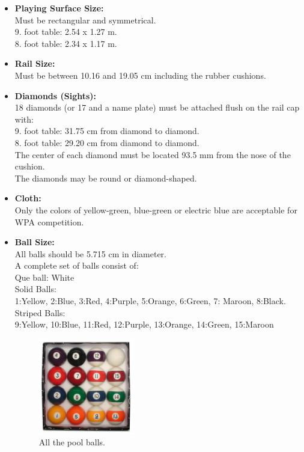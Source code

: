 \begin{itemize}
	\item \textbf{Playing Surface Size:}\\
		Must be rectangular and symmetrical.\\
		9. foot table: 2.54 x 1.27 m.\\
		8. foot table: 2.34 x 1.17 m.\\
	\item \textbf{Rail Size:}\\
		Must be between 10.16 and 19.05 cm including the rubber cushions.\\
	\item \textbf{Diamonds (Sights):}\\
		18 diamonds (or 17 and a name plate) must be attached flush on the rail cap with:\\
		9. foot table: 31.75 cm from diamond to diamond.\\
		8. foot table: 29.20 cm from diamond to diamond.\\
		The center of each diamond must be located 93.5 mm from the nose of the cushion.\\
		The diamonds may be round or diamond-shaped.\\
	\item \textbf{Cloth:}\\
		Only the colors of yellow-green, blue-green or electric blue are acceptable for WPA competition. \\
	\item \textbf{Ball Size:}\\
		All balls should be 5.715 cm in diameter.\\
		A complete set of balls consist of:\\
		Que ball: White\\
		Solid Balls:\\
		\hspace*{10 mm}	1:Yellow, 2:Blue, 3:Red, 4:Purple, 5:Orange, 6:Green, 7: Maroon, 8:Black.\\
		Striped Balls:\\
		\hspace*{10 mm}	9:Yellow, 10:Blue, 11:Red, 12:Purple, 13:Orange, 14:Green, 15:Maroon\\
		
		\begin{figure}[H]
		\begin{center}
		\leavevmode
		\includegraphics[width=0.4\textwidth]{images/poolballs.jpg}
		\end{center}
		\caption{All the pool balls.}
		\label{fig:poolballs}
		\end{figure}	
		

\end{itemize}
